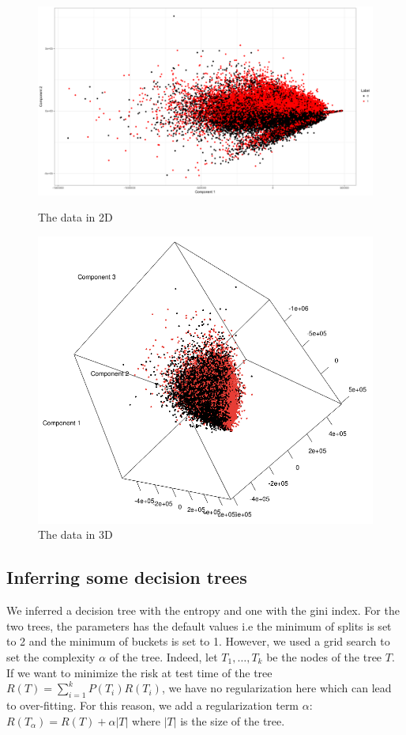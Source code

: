 \documentclass{article}
\def\tree{T}
\def\node#1{T_{#1}}
\def\risk#1{R(#1)}
\def\proba#1{P(#1)}
\def\reg{\alpha}
\begin{document}
\begin{figure}[!tbp]
  \centering
  \begin{minipage}[b]{0.4\textwidth}
    \includegraphics[width=\textwidth]{PCA1.png}
    \caption{The data in 2D}
  \end{minipage}
  \hfill
  \begin{minipage}[b]{0.4\textwidth}
    \includegraphics[width=\textwidth]{PCA2.png}
    \caption{The data in 3D}
  \end{minipage}
\end{figure}
\subsection{Inferring some decision trees}

We inferred a decision tree with the entropy and one with the gini index. For the two trees, the parameters has the default values i.e  the minimum of splits is set to 2 and the minimum of buckets is set to 1. However, we used a grid search to set the complexity $\reg$ of the tree. Indeed, let $\node{1},\dots,\node{k}$ be the nodes of the tree $\tree$. If we want to minimize the risk at test time of the tree $\risk{\tree}=\sum_{i=1}^{k}\proba{\node{i}}\risk{\node{i}}$, we have no regularization here which can lead to over-fitting. For this reason, we add a regularization term $\reg$: $\risk{\tree_{\reg}} = \risk{\tree}+ \reg|T|$ where $|T|$ is the size of the tree. 
\end{document}
